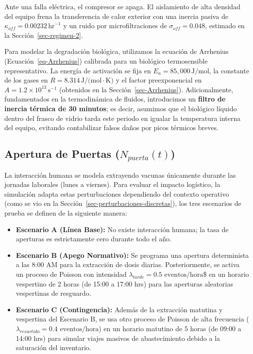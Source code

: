 \documentclass[
  spanish,
  letterpaper,
  DIV=11,
  numbers=noendperiod]{scrreprt}
\providecommand{\tightlist}{%
  \setlength{\itemsep}{0pt}\setlength{\parskip}{0pt}}
\theoremstyle{plain}
\theoremstyle{plain}
\theoremstyle{plain}
\theoremstyle{definition}
\theoremstyle{remark}
\begin{document}
Ante una falla eléctrica, el compresor se apaga. El aislamiento de alta
densidad del equipo frena la transferencia de calor exterior con una
inercia pasiva de \(\kappa_{off} = 0.00232\,\text{hr}^{-1}\) y un ruido
por microfiltraciones de \(\sigma_{off} = 0.048\), estimado en la
Sección~\ref{sec-regimen-2}.

Para modelar la degradación biológica, utilizamos la ecuación de
Arrhenius (Ecuación~\ref{eq-Arrhenius}) calibrada para un biológico
termosensible representativo. La energía de activación se fija en
\(E_a = 85,000\,\text{J/mol}\), la constante de los gases en
\(R = 8.314\,\text{J/(mol}\cdot\text{K)}\) y el factor preexponencial en
\(A = 1.2 \times 10^{13} \, \text{s}^{-1}\) (obtenidos en la
Sección~\ref{sec-Arrhenius}). Adicionalmente, fundamentados en la
termodinámica de fluidos, introducimos un \textbf{filtro de inercia
térmica de 30 minutos}; es decir, asumimos que el biológico líquido
dentro del frasco de vidrio tarda este periodo en igualar la temperatura
interna del equipo, evitando contabilizar falsos daños por picos
térmicos breves.

\subsection{\texorpdfstring{Apertura de Puertas
(\(N_{puerta}(t)\))}{Apertura de Puertas (N\_\{puerta\}(t))}}\label{sec-aperturas-puerta}

La interacción humana se modela extrayendo vacunas únicamente durante
las jornadas laborales (lunes a viernes). Para evaluar el impacto
logístico, la simulación adapta estas perturbaciones dependiendo del
contexto operativo (como se vio en la
Sección~\ref{sec-perturbaciones-discretas}), los tres escenarios de
prueba se definen de la siguiente manera:

\begin{itemize}
\tightlist
\item
  \textbf{Escenario A (Línea Base):} No existe interacción humana; la
  tasa de aperturas es estrictamente cero durante todo el año.
\item
  \textbf{Escenario B (Apego Normativo):} Se programa una apertura
  determinista a las 8:00 AM para la extracción de dosis diarias.
  Posteriormente, se activa un proceso de Poisson con intensidad
  \(\lambda_{tarde} = 0.5 \text{ eventos/hora}\)\$ en un horario
  vespertino de 2 horas (de 15:00 a 17:00 hrs) para las aperturas
  aleatorias vespertinas de resguardo.
\item
  \textbf{Escenario C (Contingencia):} Además de la extracción matutina
  y vespertina del Escenario B, se usa otro proceso de Poisson de alta
  frecuencia (\(\lambda_{resurtido} = 0.4 \text{ eventos/hora}\)) en un
  horario matutino de 5 horas (de 09:00 a 14:00 hrs) para simular viajes
  masivos de abastecimiento debido a la saturación del inventario.
\end{itemize}
\end{document}
